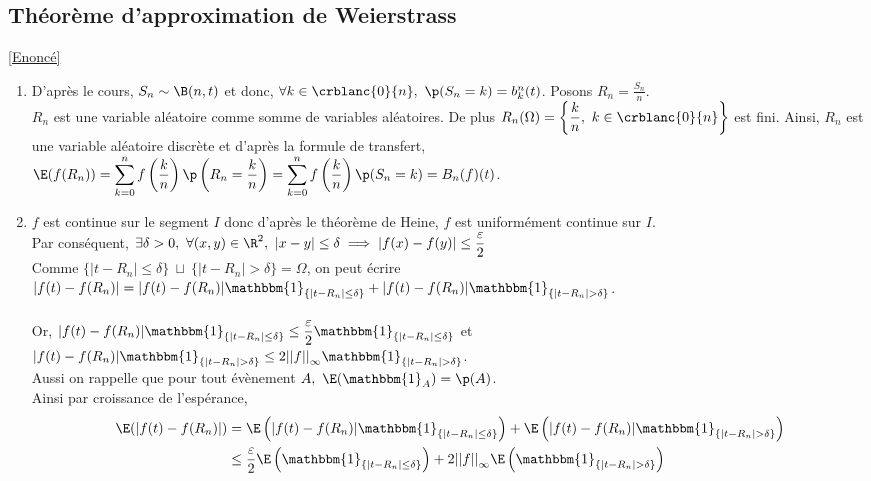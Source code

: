 \documentclass[8pt]{book}
\begin{document}
	\subsection{Théorème d'approximation de Weierstrass }
	\label{Théorème d'approximation de Weierstrass corrigé}
		\textcolor{blue}{\hyperref[Théorème d'approximation de Weierstrass]{[Enoncé]}}\\
	\begin{enumerate}
		\item D'après le cours, $S_n\sim \B(n,t)$ et donc, $\forall k\in \crblanc{0}{n},\ \p(S_n=k)=b_k^n(t)$. Posons $R_n=\displaystyle\frac{S_n}{n}$.\\
		$R_n$ est une variable aléatoire comme somme de variables aléatoires. De plus $R_n(\Omega)=\left\{\displaystyle\frac{k}{n},\ k\in\crblanc{0}{n}\right\}$ est fini. Ainsi, $R_n$ est une variable aléatoire discrète et d'après la formule de transfert,\\
		$\E(f(R_n))=\displaystyle\sum\limits_{k=0}^nf\left(\frac{k}{n}\right)\p\left(R_n=\frac{k}{n}\right)=\sum\limits_{k=0}^nf\left(\frac{k}{n}\right)\p(S_n=k)=B_n(f)(t)$.
		\item $f$ est continue sur le segment $I$ donc d'après le théorème de Heine, $f$ est uniformément continue sur $I$.\\
		Par conséquent, $\exists \delta>0,\ \forall (x,y)\in\R^2,\ |x-y|\leq \delta\implies |f(x)-f(y)|\leq \displaystyle\frac{\varepsilon}{2}$\\
		Comme $\{|t-R_n|\leq \delta\}\ \sqcup\ \{|t-R_n|>\delta\}=\Omega$, on peut écrire\\
		$|f(t)-f(R_n)|=|f(t)-f(R_n)|\mathbbm{1}_{\{|t-R_n|\leq \delta\}}+|f(t)-f(R_n)|\mathbbm{1}_{\{|t-R_n|>\delta\}}$.\\\\
		Or, $|f(t)-f(R_n)|\mathbbm{1}_{\{|t-R_n|\leq \delta\}}\leq \displaystyle\frac{\varepsilon}{2}\mathbbm{1}_{\{|t-R_n|\leq \delta\}}$ et $|f(t)-f(R_n)|\mathbbm{1}_{\{|t-R_n|> \delta\}}\leq 2{||f||}_\infty\mathbbm{1}_{\{|t-R_n|> \delta\}}$.\\
		Aussi on rappelle que pour tout évènement $A,\ \E(\mathbbm{1}_A)=\p(A)$.\\
		Ainsi par croissance de l'espérance,
		\begin{align*}
			\E(|f(t)-f(R_n)|)&=\E\left(|f(t)-f(R_n)|\mathbbm{1}_{\{|t-R_n|\leq \delta\}}\right)+\E\left(|f(t)-f(R_n)|\mathbbm{1}_{\{|t-R_n|>\delta\}}\right)\\
			&\leq \displaystyle\frac{\varepsilon}{2}\E\left(\mathbbm{1}_{\{|t-R_n|\leq \delta\}}\right)+2{||f||}_\infty\E\left(\mathbbm{1}_{\{|t-R_n|>\delta\}}\right)\\

\end{align*}
\end{enumerate}
\end{document}
